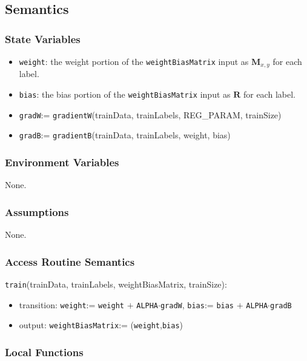 \documentclass[12pt, titlepage]{article}
\def\code#1{\texttt{#1}}
\begin{document}
\subsection{Semantics}

\subsubsection{State Variables}

\begin{itemize}
\item \code{weight}: the weight portion of the \code{weightBiasMatrix} input as $\mathbf{M}_{x,y}$ for each label.
\item \code{bias}: the bias portion of the \code{weightBiasMatrix} input as $\mathbf{R}$ for each label.
\item \code{gradW}:= \code{gradientW}(trainData, trainLabels, REG\_PARAM, trainSize)
\item \code{gradB}:= \code{gradientB}(trainData, trainLabels, weight, bias)
\end{itemize}

\subsubsection{Environment Variables}

None.

\subsubsection{Assumptions}

None.

\subsubsection{Access Routine Semantics}

\noindent \code{train}(trainData, trainLabels, weightBiasMatrix, trainSize):
\begin{itemize}
\item transition: \code{weight}:= \code{weight} $+$ \code{ALPHA}$\cdot$\code{gradW}, 
\code{bias}:= \code{bias} $+$ \code{ALPHA}$\cdot$\code{gradB}
\item output: \code{weightBiasMatrix}:= (\code{weight},\code{bias})
\end{itemize}

\subsubsection{Local Functions}
\end{document}
